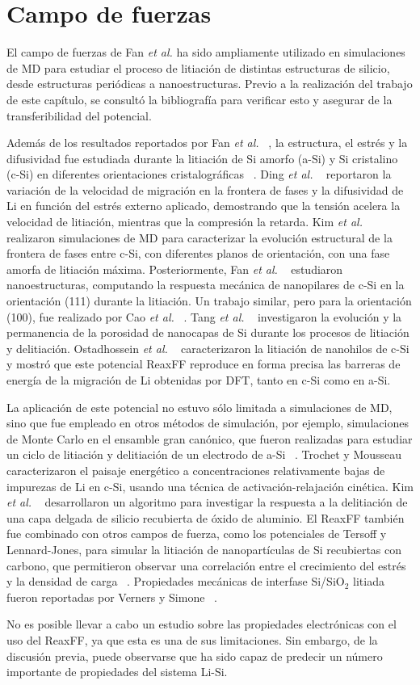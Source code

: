 \section{Campo de fuerzas}

El campo de fuerzas de Fan \textit{et al.} ha sido ampliamente utilizado en 
simulaciones de MD para estudiar el proceso de litiación de distintas estructuras
de silicio, desde estructuras periódicas a nanoestructuras. Previo a la 
realización del trabajo de este capítulo, se consultó la bibliografía para 
verificar esto y asegurar de la transferibilidad del potencial. 

Además de los resultados reportados por Fan \textit{et al.} ~\cite{fan2013}, 
la estructura, el estrés y la difusividad fue estudiada durante la litiación de 
Si amorfo (a-Si) y Si cristalino (c-Si) en diferentes orientaciones 
cristalográficas ~\cite{chen2020, kim2015}. Ding \textit{et al.} ~\cite{ding2017} 
reportaron la variación de la velocidad de migración en la frontera de fases y la 
difusividad de Li en función del estrés externo aplicado, demostrando que la 
tensión acelera la velocidad de litiación, mientras que la compresión la retarda. 
Kim \textit{et al.} ~\cite{kim2014} realizaron simulaciones de MD para caracterizar 
la evolución estructural de la frontera de fases entre c-Si, con diferentes planos 
de orientación, con una fase amorfa de litiación máxima. Posteriormente, Fan 
\textit{et al.} ~\cite{fan2018} estudiaron nanoestructuras, computando la respuesta
mecánica de nanopilares de c-Si en la orientación (111) durante la litiación.
Un trabajo similar, pero para la orientación (100), fue realizado por Cao 
\textit{et al.} ~\cite{cao2019}. Tang \textit{et al.} ~\cite{tang2019} investigaron
la evolución y la permanencia de la porosidad de nanocapas de Si durante los 
procesos de litiación y delitiación. Ostadhossein \textit{et al.} 
~\cite{ostadhossein2015} caracterizaron la litiación de nanohilos de c-Si y mostró
que este potencial ReaxFF reproduce en forma precisa las barreras de energía de 
la migración de Li obtenidas por DFT, tanto en c-Si como en a-Si.

La aplicación de este potencial no estuvo sólo limitada a simulaciones de MD, 
sino que fue empleado en otros métodos de simulación, por ejemplo, simulaciones 
de Monte Carlo en el ensamble gran canónico, que fueron realizadas para estudiar 
un ciclo de litiación y delitiación de un electrodo de a-Si ~\cite{basu2019}. 
Trochet y Mousseau ~\cite{trochet2017} caracterizaron el paisaje energético a 
concentraciones relativamente bajas de impurezas de Li en c-Si, usando una 
técnica de activación-relajación cinética. Kim \textit{et al.} ~\cite{kim2017} 
desarrollaron un algoritmo para investigar la respuesta a la delitiación de una 
capa delgada de silicio recubierta de óxido de aluminio. El ReaxFF también fue 
combinado con otros campos de fuerza, como los potenciales de Tersoff y 
Lennard-Jones, para simular la litiación de nanopartículas de Si recubiertas con 
carbono, que permitieron observar una correlación entre el crecimiento del 
estrés y la densidad de carga ~\cite{zheng2019,zheng2020}. Propiedades mecánicas 
de interfase Si/SiO$_2$ litiada fueron reportadas por Verners y 
Simone ~\cite{verners2019}. 

No es posible llevar a cabo un estudio sobre las propiedades electrónicas con el 
uso del ReaxFF, ya que esta es una de sus limitaciones. Sin embargo, de la 
discusión previa, puede observarse que ha sido capaz de predecir un número 
importante de propiedades del sistema Li-Si.
